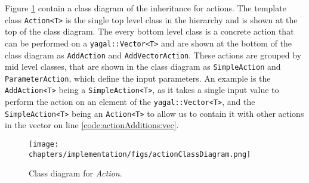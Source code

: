 Figure \ref{fig:actionClassDiagram} contain a class diagram of the inheritance for actions. The template class \texttt{Action<T>} is the single top level class in the hierarchy and is shown at the top of the class diagram. The every bottom level class is a concrete action that can be performed on a \texttt{yagal::Vector<T>} and are shown at the bottom of the class diagram as \texttt{AddAction} and \texttt{AddVectorAction}. These actions are grouped by mid level classes, that are shown in the class diagram as \texttt{SimpleAction} and \texttt{ParameterAction}, which define the input parameters. An example is the \texttt{AddAction<T>} being a \texttt{SimpleAction<T>}, as it takes a single input value to perform the action on an element of the \texttt{yagal::Vector<T>}, and the \texttt{SimpleAction<T>} being an \texttt{Action<T>} to allow us to contain it with other actions in the vector on line \ref{code:actionAdditions:vec}.

\begin{figure}[!htb]
    \centering
    \texttt{[image: chapters/implementation/figs/actionClassDiagram.png]}
    \caption{Class diagram for \textit{Action}.}
    \label{fig:actionClassDiagram}
\end{figure}
